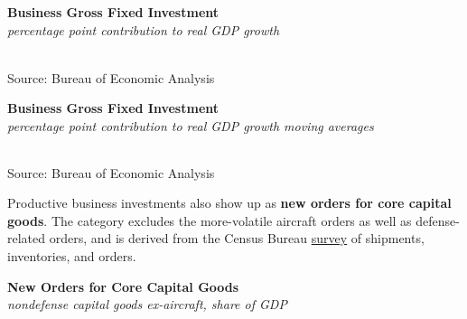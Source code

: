 \documentclass{report}
\makeatletter
\newcommand{\tbllink}[1]{\href{https://raw.githubusercontent.com/bdecon/US-chartbook/master/chartbook/data/#1}{\faTable}}
\newcommand*\short[1]{\expandafter\@gobbletwo\number\numexpr#1\relax}
\newcommand{\sbar}[4]{
		\addplot[ybar stacked, bar width=2.3pt, draw opacity=0, fill=#1] 
			table [x=#2, y=#3, col sep=comma]{#4};}
\newcommand{\dateaxisticks}{
		date coordinates in=x, axis line style={draw=none},
		xmax={2023-11-01},
		max space between ticks=40,	    
		xtick={{1990-01-01}, {1992-01-01}, {1994-01-01}, 
			{1996-01-01}, {1998-01-01}, {2000-01-01}, 
			{2002-01-01}, {2004-01-01}, {2006-01-01},
			{2008-01-01}, {2010-01-01}, {2012-01-01}, {2014-01-01},
		    {2016-01-01}, {2018-01-01}, {2020-01-01}, {2022-01-01}, 
		    {2024-01-01}, {2026-01-01}},
		minor xtick={{1989-01-01}, {1991-01-01}, {1993-01-01},
			{1995-01-01}, {1997-01-01}, {1999-01-01}, 
			{2001-01-01}, {2003-01-01}, {2005-01-01}, {2007-01-01},
		    {2009-01-01}, {2011-01-01}, {2013-01-01}, {2015-01-01},
		    {2017-01-01}, {2019-01-01}, {2021-01-01}, {2023-01-01}, 
		    {2025-01-01}, {2027-01-01}},
		enlarge y limits={0.06}, enlarge x limits={0.01},
		}
\newcommand{\bbar}[2]{extra #1 ticks = {{#2}}, extra #1 tick labels = ,
		extra #1 tick style = {grid=major, grid style={thick, black!25}},}
\newcommand{\rbars}{
		\fill[color=black!10] (axis cs:{1990-07-01},\pgfkeysvalueof{/pgfplots/ymin}) rectangle 
			(axis cs:{1991-03-01}, \pgfkeysvalueof{/pgfplots/ymax});
		\fill[color=black!10] (axis cs:{2007-12-01},\pgfkeysvalueof{/pgfplots/ymin}) rectangle 
			(axis cs:{2009-07-01}, \pgfkeysvalueof{/pgfplots/ymax});
		\fill[color=black!10] (axis cs:{2001-03-01},\pgfkeysvalueof{/pgfplots/ymin}) rectangle 
			(axis cs:{2001-11-01}, \pgfkeysvalueof{/pgfplots/ymax});
		\fill[color=black!10] (axis cs:{2020-02-01},\pgfkeysvalueof{/pgfplots/ymin}) rectangle 
			(axis cs:{2020-05-01}, \pgfkeysvalueof{/pgfplots/ymax});}
\makeatother
\begin{document}
{\begin{minipage}{0.76\textwidth}
\normalsize \textbf{Business Gross Fixed Investment}\\
\footnotesize{\textit{percentage point contribution to real GDP growth}}\\
\hspace*{-2mm} \\
\footnotesize{Source: Bureau of Economic Analysis} \hfill \tbllink{businv.csv}
\vspace{2mm}

\normalsize \textbf{Business Gross Fixed Investment}\\
\footnotesize{\textit{percentage point contribution to real GDP growth \hspace{36mm} moving averages}}\\ 
 \setlength{\tabcolsep}{3.1pt} \color{black!90}
		{\renewcommand{\arraystretch}{1.55}
		 \begin{tabular}{p{42mm} R{6.7mm} R{6.7mm} R{6.7mm} R{6.7mm} R{6.7mm} 
		   R{7.8mm} R{6.7mm} R{6.7mm} }
			  \hline
		\end{tabular}}\vspace{-2mm}
		
\footnotesize{Source: Bureau of Economic Analysis}
\end{minipage}
\newpage
{}  
\begin{minipage}{0.32\textwidth}
\small Productive business investments also show up as \textbf{new orders for core capital goods}. The category excludes the more-volatile aircraft orders as well as defense-related orders, and is derived from the Census Bureau \href{https://www.census.gov/manufacturing/m3/index.html}{survey} of shipments, inventories, and orders.  


\end{minipage} \hspace{5mm}
\begin{minipage}{0.4\textwidth}
\normalsize \textbf{New Orders for Core Capital Goods}\\
\footnotesize{\textit{nondefense capital goods ex-aircraft, share of GDP}}
\vspace{3.7cm}


\end{minipage}}
\end{document}
